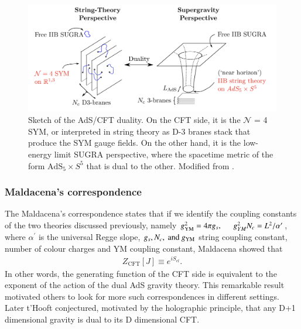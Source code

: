 \documentclass[a4paper, 12pt]{article}
\begin{document}
    \begin{figure}[h!]
    \begin{center}
      \includegraphics[scale=0.4]{Figures/duality.png}
    \end{center}
    \caption{Sketch of the AdS/CFT duality. On the CFT side, it is the
      \(\mathcal{N}\) = 4 SYM, or interpreted in string theory as D-3
      branes stack that produce the SYM gauge fields. On the other
      hand, it is the low-energy limit SUGRA perspective, where the
      spacetime metric of the form \( \mathrm{AdS}_5 \times S^5 \)
      that is dual to the other. Modified from
      \cite{samberg2012holographic}.}
    \label{fig:duality}
    \end{figure}

  \subsubsection{Maldacena's correspondence}%
    \label{sub:Maldacena's correspondence}
   The Maldacena's correspondence states that if we identify the
   coupling constants of the two theories discussed previously, namely \(
   g_{\mathrm{YM}}^{2} = 4 \pi g_{s}, \hspace{0.5cm} g_{YM}^{2} N_c = L^2
   / \alpha^{\prime}\), where \( \alpha^{\prime} \) is the universal
   Regge slope, \( g_s, N_c, \textnormal{ and } g_{\mathrm{YM}} \) string coupling
   constant, number of colour charges and YM coupling constant, Maldacena
   showed that
   \begin{align}
    \label{correspondence}
     Z_{\mathrm{CFT}}[J] \equiv e^{i S_{cl}}.  
   \end{align} In other words, the generating function of the CFT side is
   equivalent to the exponent of the action of the dual AdS gravity
   theory. This remarkable result motivated others to look for more such
   correspondences in different settings. Later t'Hooft
   conjectured, motivated by the holographic
   principle\cite{susskind1995world}, that any D+1 dimensional gravity
   is dual to its D dimensional CFT\cite{hooft2001holographic}. 
   
\end{document}
